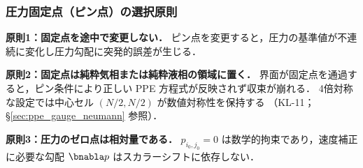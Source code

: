 \subsubsection{圧力固定点（ピン点）の選択原則}
\label{sec:pinpoint}

\noindent\textbf{原則1：固定点を途中で変更しない．}
ピン点を変更すると，圧力の基準値が不連続に変化し圧力勾配に突発的誤差が生じる．

\noindent\textbf{原則2：固定点は純粋気相または純粋液相の領域に置く．}
界面が固定点を通過すると，ピン条件により正しい PPE 方程式が反映されず収束が崩れる．
4倍対称な設定では中心セル $(N/2,N/2)$ が数値対称性を保持する
（KL-11；§\ref{sec:ppe_gauge_neumann} 参照）．

\noindent\textbf{原則3：圧力のゼロ点は相対量である．}
$p_{i_0,j_0} = 0$ は数学的拘束であり，速度補正に必要な勾配 $\bnabla p$ はスカラーシフトに依存しない．
